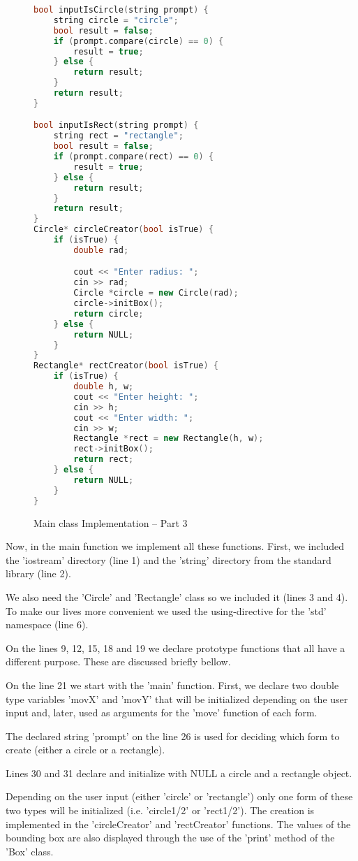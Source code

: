 \documentclass[a4paper, 10pt]{article}
\begin{document}
\begin{figure}[H]
\begin{lstlisting}[language=c++]
bool inputIsCircle(string prompt) {
	string circle = "circle";
	bool result = false;
	if (prompt.compare(circle) == 0) {
		result = true;
	} else {
		return result;
	}
	return result;
}

bool inputIsRect(string prompt) {
	string rect = "rectangle";
	bool result = false;
	if (prompt.compare(rect) == 0) {
		result = true;
	} else {
		return result;
	}
	return result;
}
Circle* circleCreator(bool isTrue) {
	if (isTrue) {
		double rad;

		cout << "Enter radius: ";
		cin >> rad;
		Circle *circle = new Circle(rad);
		circle->initBox();
		return circle;
	} else {
		return NULL;
	}
}
Rectangle* rectCreator(bool isTrue) {
	if (isTrue) {
		double h, w;
		cout << "Enter height: ";
		cin >> h;
		cout << "Enter width: ";
		cin >> w;
		Rectangle *rect = new Rectangle(h, w);
		rect->initBox();
		return rect;
	} else {
		return NULL;
	}
}
\end{lstlisting}
\caption{Main class Implementation – Part 3}
\end{figure}
Now, in the main function we implement all these functions. First, we included the 'iostream' directory (line 1) and the 'string' directory from the standard library (line 2).

We also need the 'Circle' and 'Rectangle' class so we included it (lines 3 and 4). To make our lives more convenient we used the using-directive for the 'std' namespace (line 6).

On the lines 9, 12, 15, 18 and 19 we declare prototype functions that all have a different purpose. These are discussed briefly bellow.

On the line 21 we start with the 'main' function. First, we declare two double type variables 'movX' and 'movY' that will be initialized depending on the user input and, later, used as arguments for the 'move' function of each form.

The declared string 'prompt' on the line 26 is used for deciding which form to create (either a circle or a rectangle).

Lines 30 and 31 declare and initialize with NULL a circle and a rectangle object.

Depending on the user input (either 'circle' or 'rectangle') only one form of these two types will be initialized (i.e. 'circle1/2' or 'rect1/2'). The creation is implemented in the 'circleCreator' and 'rectCreator' functions. The values of the bounding box are also displayed through the use of the 'print' method of the 'Box' class.
\end{document}

